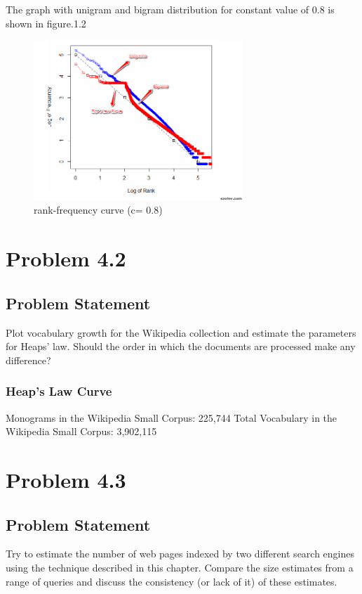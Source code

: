 \documentclass[12pt]{report}
\begin{document}
The graph with unigram and bigram distribution for constant value of 0.8 is shown in figure.1.2
 
\begin{figure}[ht] 
  \centering
  \includegraphics[width=0.7\textwidth]{Problem41C08.png}
  \caption{ rank-frequency curve (c= 0.8)}
  \label{fig:2}
\end{figure}

\chapter{Problem 4.2}
\section{Problem Statement}
Plot vocabulary growth for the Wikipedia collection and estimate the parameters for Heaps’ law. Should the order in which the documents are processed make any difference?
\subsection{Heap's Law Curve}

Monograms in the Wikipedia Small Corpus: 225,744
Total Vocabulary in the Wikipedia Small Corpus: 3,902,115


\chapter{Problem 4.3}
\section{Problem Statement}
Try to estimate the number of web pages indexed by two different search engines using the technique described in this chapter. Compare the size estimates from a range of queries and discuss the consistency (or lack of it) of these estimates. 
\end{document}
